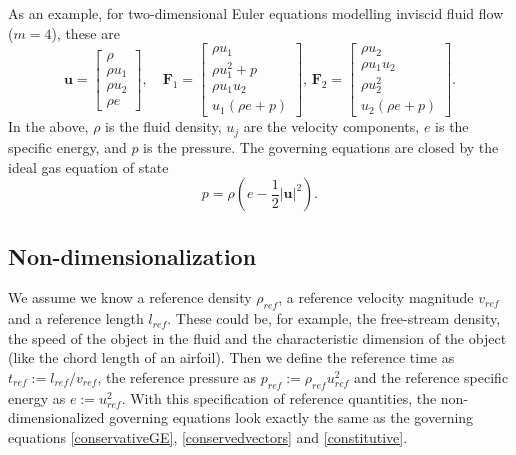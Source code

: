 \let\bld\boldsymbol

As an example, for two-dimensional Euler equations modelling inviscid fluid flow  ($m=4$), these are
\begin{equation}
\bld{u} = 
\begin{bmatrix}
\rho \\ \rho u_1 \\ \rho u_2 \\ \rho e
\end{bmatrix}, \quad
\bld{F}_1 = 
\begin{bmatrix}
\rho u_1 \\ \rho u_1^2 + p \\ \rho u_1 u_2 \\ u_1 (\rho e + p)
\end{bmatrix}, \,
\bld{F}_2 = 
\begin{bmatrix}
\rho u_2 \\ \rho u_1 u_2 \\ \rho u_2^2 \\ u_2 (\rho e + p)
\end{bmatrix}.
\label{conservedvectors}
\end{equation}
In the above, $\rho$ is the fluid density, $u_j$ are the velocity components, $e$ is the specific energy, and $p$ is the pressure. The governing equations are closed by the ideal gas equation of state
\begin{equation}
p = \rho (e - \frac12 \vert \bld{u} \vert^2).
\label{constitutive}
\end{equation}

\subsection{Non-dimensionalization}
We assume we know a reference density $\rho_{ref}$, a reference velocity magnitude $v_{ref}$ and a reference length $l_{ref}$. These could be, for example, the free-stream density, the speed of the object in the fluid and the characteristic dimension of the object (like the chord length of an airfoil). Then we define the reference time as $t_{ref} := l_{ref}/v_{ref}$, the reference pressure as $p_{ref} := \rho_{ref}u_{ref}^2$ and the reference specific energy as $e := u_{ref}^2$. With this specification of reference quantities, the non-dimensionalized governing equations look exactly the same as the governing equations \eqref{conservativeGE}, \eqref{conservedvectors} and \eqref{constitutive}.
